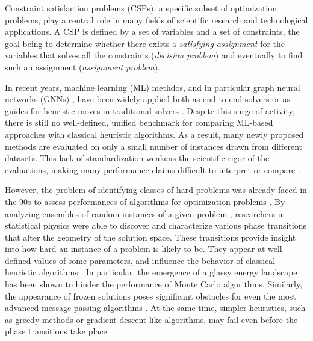 \documentclass{article}
\begin{document}
Constraint satisfaction problems (CSPs), a specific subset of optimization problems, play a central role in many fields of scientific research and technological applications. A CSP is defined by a set of variables and a set of constraints, the goal being to determine whether there exists a \emph{satisfying assignment} for the variables that solves all the constraints (\textit{decision problem}) and eventually to find such an assignment (\textit{assignment problem}).

In recent years, machine learning (ML) methdos, and in particular graph neural networks (GNNs) \cite{scarselli2008graph}, have been widely applied both as end-to-end solvers \cite{holden_machine_2021,shi_satformer_2022,selsam_learning_2019,li_deepsat_2022,ozolins_goal-aware_2022,yan_addressing_2023,sun_difusco_2023,freivalds_denoising_2022,duan_augment_2022,achlioptas_hide_2022,Karalias2020,Joshi2020,cameron_predicting_2020,Gasse2019,Li2018,li_nsnet_2022, cappart2023combinatorial, kotary2021end, bengio2021machine} or as guides for heuristic moves in traditional solvers \cite{ciarella2023machine,wang2024neuroback}. 
Despite this surge of activity, there is still no well-defined, unified benchmark for comparing ML-based approaches with classical heuristic algorithms. As a result, many newly proposed methods are evaluated on only a small number of instances drawn from different datasets. This lack of standardization weakens the scientific rigor of the evaluations, making many performance claims difficult to interpret or compare \cite{schuetz2022combinatorial, boettcher2023inability, angelini2023modern, schuetz2023reply, schuetz2023replym}.

However, the problem of identifying classes of hard problems was already faced in the 90s to assess performances of algorithms for optimization problems \cite{cheeseman1991really}. By analyzing ensembles of random instances of a given problem \cite{kirkpatrick1994critical, selman1996generating}, researchers in statistical physics were able to discover and characterize various phase transitions that alter the geometry of the solution space. These transitions provide insight into how hard an instance of a problem is likely to be. They appear at well-defined values of some parameters, and influence the behavior of classical heuristic algorithms \cite{monasson1999determining, krzakala2007gibbs,ricci2009cavity, mezard2009information, marino2023hard, angelini2023limits}.
In particular, the emergence of a glassy energy landscape has been shown to hinder the performance of Monte Carlo algorithms. Similarly, the appearance of frozen solutions poses significant obstacles for even the most advanced message-passing algorithms \cite{zdeborová2009statistical}. At the same time, simpler heuristics, such as greedy methods or gradient-descent-like algorithms, may fail even before the phase transitions take place.
\end{document}
